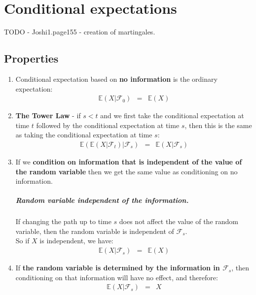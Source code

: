 \chapter{Conditional expectations}

TODO - Joshi1.page155 - creation of martingales.

\section{Properties}
\begin{enumerate}
	\item Conditional expectation based on \textbf{\color{blue}no information} is the ordinary expectation:
	\begin{eqnarray}
	\mathbb{E}(X\vert \mathscr{F}_{0}) &=& \mathbb{E}(X)
	\end{eqnarray}
	\item \textbf{\color{blue}The Tower Law} - if $s < t$ and we first take the conditional expectation at time $t$ followed by the conditional expectation at time $s$, then this is the same as taking the conditional expectation at time $s$:
	\begin{eqnarray}
		\mathbb{E}(\mathbb{E}(X\vert \mathscr{F}_{t})\vert \mathscr{F}_{s}) &=& \mathbb{E}(X \vert \mathscr{F}_{s})
	\end{eqnarray}
	\item If we \textbf{\color{blue}condition on information that is independent of the value of the random variable} then we get the same value as conditioning on no information.
	\paragraph{Random variable independent of the information.}
	If changing the path up to time $s$ does not affect the value of the random variable, then the random variable is independent of $\mathscr{F}_{s}$.\\
	So if $X$ is independent, we have:
	\begin{eqnarray}
		\mathbb{E}(X\vert \mathscr{F}_{s}) &=& \mathbb{E}(X)
	\end{eqnarray}
	\item If \textbf{\color{blue}the random variable is determined by the information in $\mathscr{F}_{s}$}, then conditioning on that information will have no effect, and therefore:
	\begin{eqnarray}
	\mathbb{E}(X\vert\mathscr{F}_{s}) &=& X
	\end{eqnarray}
\end{enumerate}

